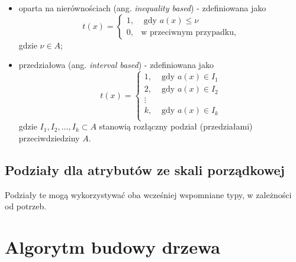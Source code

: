 \documentclass[]{book}
\providecommand{\tightlist}{%
  \setlength{\itemsep}{0pt}\setlength{\parskip}{0pt}}
\theoremstyle{plain}
\theoremstyle{definition}
\theoremstyle{definition}
\theoremstyle{definition}
\theoremstyle{definition}
\theoremstyle{remark}
\begin{document}
\begin{itemize}
\tightlist
\item
  oparta na nierównościach (ang. \emph{inequality based}) - zdefiniowana jako
  \begin{equation}
  t(x) = \begin{cases}
    1, &\text{ gdy }a(x)\leq \nu\\
    0, & \text{w przeciwnym przypadku},
    \end{cases}
  \end{equation}
  gdzie \(\nu\in A\);
\item
  przedziałowa (ang. \emph{interval based}) - zdefiniowana jako
  \begin{equation}
    t(x) = \begin{cases}
        1, &\text{ gdy }a(x) \in I_1\\
        2, &\text{ gdy }a(x) \in I_2\\
        \vdots & \\
        k, &\text{ gdy }a(x) \in I_k\\
    \end{cases}
  \end{equation}
  gdzie \(I_1,I_2,\ldots,I_k\subset A\) stanowią rozłączny podział (przedziałami) przeciwdziedziny \(A\).
\end{itemize}

\hypertarget{podziay-dla-atrybutow-ze-skali-porzadkowej}{%
\subsection{Podziały dla atrybutów ze skali porządkowej}\label{podziay-dla-atrybutow-ze-skali-porzadkowej}}

Podziały te mogą wykorzystywać oba wcześniej wspomniane typy, w zależności od potrzeb.

\hypertarget{algorytm-budowy-drzewa}{%
\section{Algorytm budowy drzewa}\label{algorytm-budowy-drzewa}}
\end{document}
